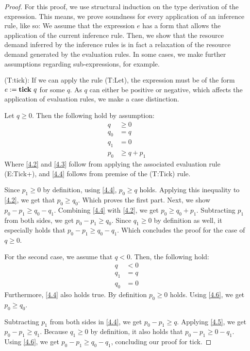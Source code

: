 \begin{proof}
For this proof, we use structural induction on the type derivation of the expression. This means, we prove soundness for every application of an inference rule, like so: We assume that the expression \(e\) has a form that allows the application of the current inference rule. Then, we show that the resource demand inferred by the inference rules is in fact a relaxation of the resource demand generated by the evaluation rules. In some cases, we make further assumptions regarding sub-expressions, for example.

(T:tick): If we can apply the rule (T:Let), the expression must be of the form \(e := \mathbf{tick}~q\) for some \(q\). As \(q\) can either be positive or negative, which affects the application of evaluation rules, we make a case distinction. 

Let \(q \geq 0\). Then the following hold by assumption:
   \begin{align}
      q     &\geq 0 \label{4.1}\\
      q_0   &= q \label{4.2}\\
      q_1   &= 0 \label{4.3}\\
      p_0   &\geq q + p_1 \label{4.4}
   \end{align}
   Where \cref{4.2} and \cref{4.3} follow from applying the associated evaluation rule (E:Tick+), and \cref{4.4} follows from premise of the (T:Tick) rule.

   Since \(p_1 \geq 0\) by definition, using \cref{4.4}, \(p_0 \geq q\) holds. Applying this inequality to \cref{4.2}, we get that \(p_0 \geq q_0\). Which proves the first part.
   Next, we show \(p_0 - p_1 \geq q_0 - q_1\). Combining \cref{4.4} with \cref{4.2}, we get \(p_0 \geq q_0 + p_1\). Subtracting \(p_1\) from both sides, we get \(p_0 - p_1 \geq q_0\). Since \(q_1 \geq 0\) by definition as well, it especially holds that \(p_0 - p_1 \geq q_0 - q_1\). Which concludes the proof for the case of \(q \geq 0\).

   For the second case, we assume that \(q < 0\). Then, the following hold:
   \begin{align}
      q     & < 0 \\
      q_1   & = q \label{4.5}\\
      q_0   & = 0 \label{4.6}
   \end{align}
   Furthermore, \cref{4.4} also holds true. By definition \(p_0 \geq 0\) holds. Using \ref{4.6}, we get \(p_0 \geq q_0\). 

    Subtracting \(p_1\) from both sides in \ref{4.4}, we get \(p_0 - p_1 \geq q \). Applying \cref{4.5}, we get \(p_0 - p_1 \geq q_1\). Because \(q_1 \geq 0\) by definition, it also holds that \(p_0 - p_1 \geq 0 - q_1\). Using \ref{4.6}, we get \(p_0 - p_1 \geq q_0 - q_1\), concluding our proof for tick.


\end{proof}
